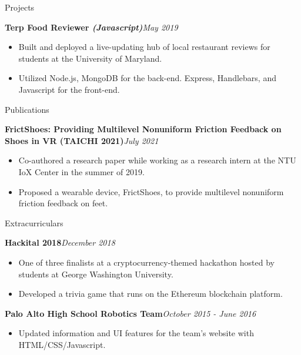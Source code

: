 \documentclass{resume} %
\begin{document}
\begin{rSection}{Projects}
\begin{rSubsection}{\bf Terp Food Reviewer \hspace{0.1em} \it (Javascript)}{\em May 2019}{}{}
\begin{itemize}
    \item Built and deployed a live-updating hub of local restaurant reviews for students at the University of Maryland.\vspace{-0.6em}
    \item Utilized Node.js, MongoDB for the back-end. Express, Handlebars, and Javascript for the front-end.
\end{itemize}
\end{rSubsection}


\end{rSection}


\begin{rSection}{Publications} \itemsep -3pt
\begin{rSubsection}{\bf FrictShoes: Providing Multilevel Nonuniform Friction Feedback on Shoes in VR (TAICHI 2021)}{\em July 2021}{}{}
\begin{itemize}
    \item Co-authored a research paper while working as a research intern at the NTU IoX Center in the summer of 2019.\vspace{-0.6em}
    \item Proposed a wearable device, FrictShoes, to provide multilevel nonuniform friction feedback on feet.
\end{itemize}
\end{rSubsection}
\end{rSection}

\begin{rSection}{Extracurriculars} \itemsep -3pt
\begin{rSubsection}{\bf Hackital 2018}{\em December 2018}{}{}
\begin{itemize}
    \item One of three finalists at a cryptocurrency-themed hackathon hosted by students at George Washington University. \vspace{-0.6em}
    \item Developed a trivia game that runs on the Ethereum blockchain platform.
\end{itemize}
\end{rSubsection}

\begin{rSubsection}{{\bf Palo Alto High School Robotics Team}}{\em October 2015 - June 2016}{}{}
\begin{itemize}
    \item Updated information and UI features for the team's website with HTML/CSS/Javascript.
\end{itemize}
\end{rSubsection}

\end{rSection}



\end{document}
